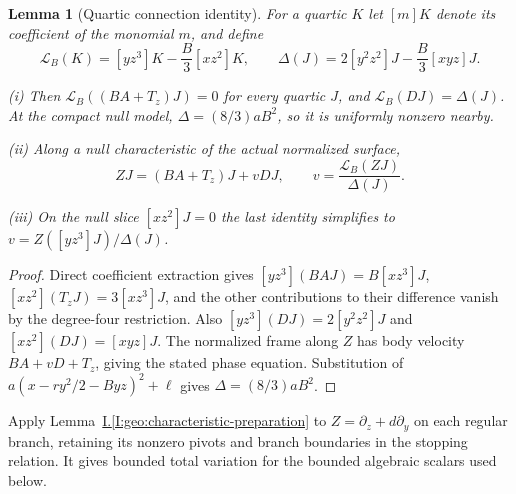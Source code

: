 \documentclass[11pt]{amsart}
\newtheorem{lemma}[theorem]{Lemma}
\theoremstyle{definition}
\theoremstyle{remark}
\numberwithin{equation}{section}
\newcommand{\partIref}[1]{\hyperref[I:#1]{I.\ref*{I:#1}}}
\begin{document}
\begin{lemma}[Quartic connection identity]\label{low:4:sf:lem:connection}
For a quartic $K$ let $[m]K$ denote its coefficient of the monomial $m$, and define
\[
\mathcal L_B(K)=[yz^3]K-\frac B3[xz^2]K,
\qquad
\Delta(J)=2[y^2z^2]J-\frac B3[xyz]J.
\]

\noindent\textup{(i)} Then $\mathcal L_B((BA+T_z)J)=0$ for every quartic $J$, and $\mathcal L_B(DJ)=\Delta(J)$. At the compact null model, $\Delta=(8/3)aB^2$, so it is uniformly nonzero nearby.

\noindent\textup{(ii)} Along a null characteristic of the actual normalized surface,
\[
ZJ=(BA+T_z)J+vDJ,\qquad
v=\frac{\mathcal L_B(ZJ)}{\Delta(J)}.
\]

\noindent\textup{(iii)} On the null slice $[xz^2]J=0$ the last identity simplifies to $v=Z([yz^3]J)/\Delta(J)$.
\end{lemma}
\begin{proof}
Direct coefficient extraction gives $[yz^3](BAJ)=B[xz^3]J$, $[xz^2](T_zJ)=3[xz^3]J$, and the other contributions to their difference vanish by the degree-four restriction. Also $[yz^3](DJ)=2[y^2z^2]J$ and $[xz^2](DJ)=[xyz]J$. The normalized frame along $Z$ has body velocity $BA+vD+T_z$, giving the stated phase equation. Substitution of $a(x-r y^2/2-B yz)^2+\ell$ gives $\Delta=(8/3)aB^2$.
\end{proof}

Apply Lemma~\partIref{geo:characteristic-preparation} to $Z=\partial_z+d\partial_y$ on each regular branch, retaining its nonzero pivots and branch boundaries in the stopping relation. It gives bounded total variation for the bounded algebraic scalars used below.
\end{document}
